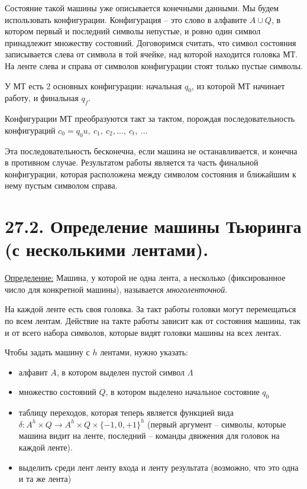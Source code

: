 \documentclass[a4paper, 12pt]{article}
\newcommand{\definition}{\underline{Определение:} }
\begin{document}
Состояние такой машины уже описывается конечными данными. Мы будем использовать конфигурации. Конфигурация -- это слово в алфавите $A \cup Q$, в котором первый и последний символы непустые, и ровно один символ принадлежит множеству состояний. Договоримся считать, что символ состояния записывается слева от символа в той ячейке, над которой находится головка МТ. На ленте слева и справа от символов конфигурации стоят только пустые
символы.

У МТ есть 2 основных конфигурации: начальная $q_0$, из которой МТ начинает работу, и финальная $q_f$.

Конфигурации МТ преобразуются такт за тактом, порождая последовательность конфигураций $c_0 = q_0u,\ c_1,\ c_2, \ldots ,\ c_t,\ \ldots$

Эта последовательность бесконечна, если машина не останавливается, и конечна в
противном случае. Результатом работы является та часть финальной конфигурации, которая расположена между символом состояния и ближайшим к нему пустым символом справа.

\section*{27.2. Определение машины Тьюринга (с несколькими лентами).}

\definition{Машина, у которой не одна лента, а несколько
(фиксированное число для конкретной машины), называется \textit{многоленточной}.}

На каждой ленте есть своя головка. За такт работы головки могут перемещаться по всем лентам. Действие на такте работы зависит как от состояния машины, так и от всего набора символов, которые
видят головки машины на всех лентах.

Чтобы задать машину с $h$ лентами, нужно указать: 

\begin{itemize}
    \item алфавит $A$, в котором выделен пустой символ $\Lambda$
    \item множество состояний $Q$, в котором выделено начальное состояние $q_0$
    \item таблицу переходов, которая теперь является функцией вида $\delta : A^h \times Q \to A^h \times Q \times \{-1, 0, +1\}^h$ (первый аргумент -- символы, которые машина видит на ленте, последний -- команды движения для головок на каждой ленте).
    \item выделить среди лент ленту входа и ленту результата (возможно, что это одна и та же лента)
\end{itemize}
\end{document}
